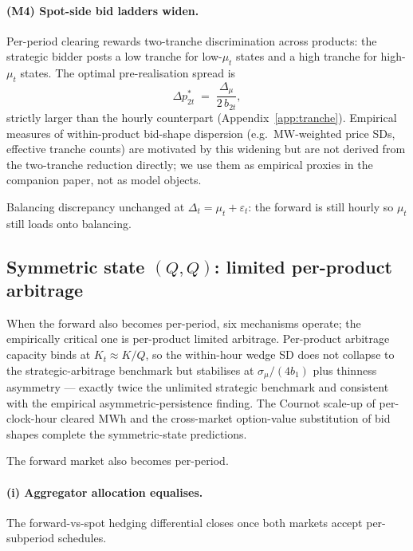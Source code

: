\documentclass[11pt]{article}
\begin{document}
\paragraph{(M4) Spot-side bid ladders widen.} Per-period clearing rewards two-tranche discrimination across products: the strategic bidder posts a low tranche for low-$\mu_t$ states and a high tranche for high-$\mu_t$ states. The optimal pre-realisation spread is
\begin{equation}
\boxed{\;\Delta p^*_{2t} \;=\; \frac{\Delta_\mu}{2\, b_{2t}},\;}
\label{eq:tranche-id}
\end{equation}
strictly larger than the hourly counterpart (Appendix~\ref{app:tranche}). Empirical measures of within-product bid-shape dispersion (e.g.\ MW-weighted price SDs, effective tranche counts) are motivated by this widening but are not derived from the two-tranche reduction directly; we use them as empirical proxies in the companion paper, not as model objects.

Balancing discrepancy unchanged at $\Delta_t = \mu_t + \varepsilon_t$: the forward is still hourly so $\mu_t$ still loads onto balancing.

\subsection{Symmetric state $(Q,Q)$: limited per-product arbitrage}\label{sec:da15}

When the forward also becomes per-period, six mechanisms operate; the empirically critical one is per-product limited arbitrage. Per-product arbitrage capacity binds at $K_t \approx K/Q$, so the within-hour wedge SD does not collapse to the strategic-arbitrage benchmark but stabilises at $\sigma_\mu/(4 b_1)$ plus thinness asymmetry --- exactly twice the unlimited strategic benchmark and consistent with the empirical asymmetric-persistence finding. The Cournot scale-up of per-clock-hour cleared MWh and the cross-market option-value substitution of bid shapes complete the symmetric-state predictions.

The forward market also becomes per-period.

\paragraph{(i) Aggregator allocation equalises.} The forward-vs-spot hedging differential closes once both markets accept per-subperiod schedules.
\end{document}
